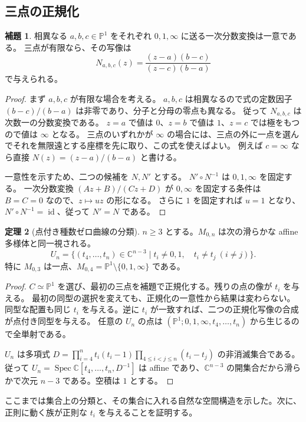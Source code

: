 \documentclass[dvipdfmx,a4paper,11pt]{article}
\theoremstyle{definition}
\newtheorem{thm}{定理}[section]
\newtheorem{lem}[thm]{補題}
\newcommand{\C}{\mathbb C}\newcommand{\R}{\mathbb R}\newcommand{\Z}{\mathbb Z}\newcommand{\Q}{\mathbb Q}
\newcommand{\PP}{\mathbb P}\newcommand{\HH}{\mathbb H}
\DeclareMathOperator{\Spec}{Spec}\DeclareMathOperator{\Proj}{Proj}\DeclareMathOperator{\GL}{GL}
\newcommand{\id}{\operatorname{id}}
\begin{document}
\subsection{三点の正規化}
\begin{lem}\label{lem:normalize}
相異なる $a,b,c\in\PP^1$ をそれぞれ $0,1,\infty$ に送る一次分数変換は一意である。
三点が有限なら、その写像は
\[
N_{a,b,c}(z)=\frac{(z-a)(b-c)}{(z-c)(b-a)}
\]
で与えられる。
\end{lem}
\begin{proof}
まず $a,b,c$ が有限な場合を考える。
$a,b,c$ は相異なるので式の定数因子 $(b-c)/(b-a)$ は非零であり、分子と分母の零点も異なる。
従って $N_{a,b,c}$ は次数一の分数変換である。
$z=a$ で値は $0$、$z=b$ で値は $1$、$z=c$ では極をもつので値は $\infty$ となる。
三点のいずれかが $\infty$ の場合には、三点の外に一点を選んでそれを無限遠とする座標を先に取り、この式を使えばよい。
例えば $c=\infty$ なら直接 $N(z)=(z-a)/(b-a)$ と書ける。

一意性を示すため、二つの候補を $N,N'$ とする。
$N'\circ N^{-1}$ は $0,1,\infty$ を固定する。
一次分数変換 $(Az+B)/(Cz+D)$ が $0,\infty$ を固定する条件は $B=C=0$ なので、$z\mapsto uz$ の形になる。
さらに $1$ を固定すれば $u=1$ となり、$N'\circ N^{-1}=\id$、従って $N'=N$ である。
\end{proof}
\begin{thm}[点付き種数ゼロ曲線の分類]\label{thm:g0}
$n\ge3$ とする。$M_{0,n}$ は次の滑らかな affine 多様体と同一視される。
\[
U_n=\{(t_4,\ldots,t_n)\in\C^{n-3}\mid
 t_i\neq0,1,\quad t_i\neq t_j\ (i\neq j)\}.
\]
特に $M_{0,3}$ は一点、$M_{0,4}=\PP^1\setminus\{0,1,\infty\}$ である。
\end{thm}
\begin{proof}
$C\simeq\PP^1$ を選び、最初の三点を補題で正規化する。残りの点の像が $t_i$ を与える。
最初の同型の選択を変えても、正規化の一意性から結果は変わらない。
同型な配置も同じ $t_i$ を与える。逆に $t_i$ が一致すれば、二つの正規化写像の合成が点付き同型を与える。
任意の $U_n$ の点は $(\PP^1;0,1,\infty,t_4,\ldots,t_n)$ から生じるので全単射である。

$U_n$ は多項式
$D=\prod_{i=4}^nt_i(t_i-1)\prod_{4\le i<j\le n}(t_i-t_j)$
の非消滅集合である。従って $U_n=\Spec\C[t_4,\ldots,t_n,D^{-1}]$ は affine であり、$\C^{n-3}$ の開集合だから滑らかで次元 $n-3$ である。空積は $1$ とする。
\end{proof}
ここまでは集合上の分類と、その集合に入れる自然な空間構造を示した。次に、正則に動く族が正則な $t_i$ を与えることを証明する。
\end{document}

